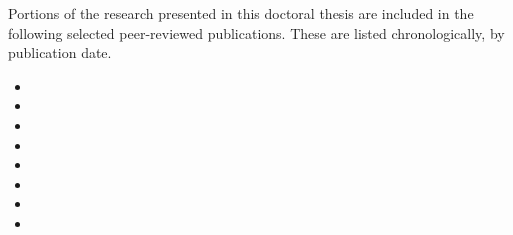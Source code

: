 
\begin{preamble}
Portions of the research presented in this doctoral thesis are included in the following selected peer-reviewed publications. These are listed chronologically, by publication date.

\begin{itemize}
    \item{}
    \item{}
    \item{}
    \item{}
    \item{}
    \item{}
    \item{}
    \item{}
\end{itemize}

\end{preamble}